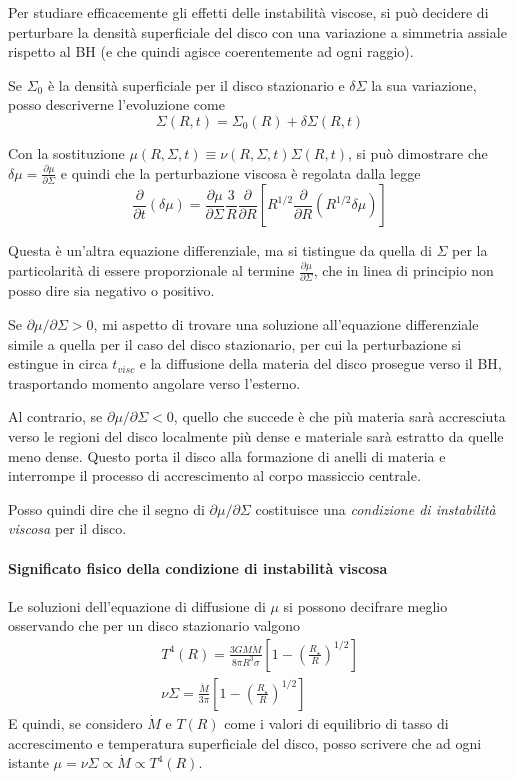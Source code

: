 \documentclass[a4paperbi]{article}
\begin{document}
	Per studiare efficacemente gli effetti delle instabilità viscose, si può decidere di perturbare la densità superficiale del disco con una variazione a simmetria assiale rispetto al BH (e che quindi agisce coerentemente ad ogni raggio).
	
	Se $\Sigma_0$ è la densità superficiale per il disco stazionario e $\delta\Sigma$ la sua variazione, posso descriverne l'evoluzione come
	\begin{equation}
		\Sigma(R,t)=\Sigma_0(R)+\delta\Sigma(R,t)
	\end{equation}
	
	Con la sostituzione $\mu(R,\Sigma,t)\equiv\nu(R,\Sigma,t)\Sigma(R,t)$, si può dimostrare che $\delta\mu=\frac{\partial\mu}{\partial\Sigma}$ e quindi che la perturbazione viscosa è regolata dalla legge
	\begin{equation}
		\frac{\partial}{\partial t}(\delta\mu)=\frac{\partial\mu}{\partial\Sigma}\frac{3}{R}\frac{\partial}{\partial R}\left[R^{1/2}\frac{\partial}{\partial R}(R^{1/2}\delta\mu)\right]
	\end{equation}
	
	Questa è un'altra equazione differenziale, ma si tistingue da quella di $\Sigma$ per la particolarità di essere proporzionale al termine $\frac{\partial\mu}{\partial\Sigma}$, che in linea di principio non posso dire sia negativo o positivo.
	
	Se $\partial\mu/\partial\Sigma>0$, mi aspetto di trovare una soluzione all'equazione differenziale simile a quella per il caso del disco stazionario, per cui la perturbazione si estingue in circa $t_{visc}$ e la diffusione della materia del disco prosegue verso il BH, trasportando momento angolare verso l'esterno. 
	
	Al contrario, se $\partial\mu/\partial\Sigma<0$, quello che succede è che più materia sarà accresciuta verso le regioni del disco localmente più dense e materiale sarà estratto da quelle meno dense. Questo porta il disco alla formazione di anelli di materia e interrompe il processo di accrescimento al corpo massiccio centrale.
	
	Posso quindi dire che il segno di $\partial\mu/\partial\Sigma$ costituisce una \textit{condizione di instabilità viscosa} per il disco.
	
	\paragraph{Significato fisico della condizione di instabilità viscosa}
	Le soluzioni dell'equazione di diffusione di $\mu$ si possono decifrare meglio osservando che per un disco stazionario valgono
	\begin{gather*}
				T^4(R)=\frac{3GM\dot{M}}{8\pi R^3\sigma}\left[1-\left(\frac{R_{\star}}{R}\right)^{1/2}\right]\\
				\nu\Sigma=\frac{\dot{M}}{3\pi}\left[1-\left(\frac{R_{\star}}{R}\right)^{1/2}\right]
	\end{gather*}
	E quindi, se considero $\dot{M}$ e $T(R)$ come i valori di equilibrio di tasso di accrescimento e temperatura superficiale del disco, posso scrivere che ad ogni istante $\mu=\nu\Sigma\propto\dot{M}\propto T^4(R)$.
	
\end{document}

